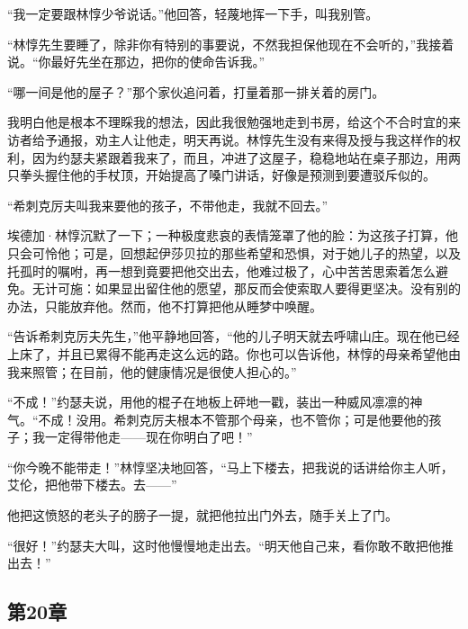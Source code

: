 \par “我一定要跟林惇少爷说话。”他回答，轻蔑地挥一下手，叫我别管。
\par “林惇先生要睡了，除非你有特别的事要说，不然我担保他现在不会听的，”我接着说。“你最好先坐在那边，把你的使命告诉我。”
\par “哪一间是他的屋子？”那个家伙追问着，打量着那一排关着的房门。
\par 我明白他是根本不理睬我的想法，因此我很勉强地走到书房，给这个不合时宜的来访者给予通报，劝主人让他走，明天再说。林惇先生没有来得及授与我这样作的权利，因为约瑟夫紧跟着我来了，而且，冲进了这屋子，稳稳地站在桌子那边，用两只拳头握住他的手杖顶，开始提高了嗓门讲话，好像是预测到要遭驳斥似的。
\par “希刺克厉夫叫我来要他的孩子，不带他走，我就不回去。”
\par 埃德加·林惇沉默了一下；一种极度悲哀的表情笼罩了他的脸：为这孩子打算，他只会可怜他；可是，回想起伊莎贝拉的那些希望和恐惧，对于她儿子的热望，以及托孤时的嘱咐，再一想到竟要把他交出去，他难过极了，心中苦苦思索着怎么避免。无计可施：如果显出留住他的愿望，那反而会使索取人要得更坚决。没有别的办法，只能放弃他。然而，他不打算把他从睡梦中唤醒。
\par “告诉希刺克厉夫先生，”他平静地回答，“他的儿子明天就去呼啸山庄。现在他已经上床了，并且已累得不能再走这么远的路。你也可以告诉他，林惇的母亲希望他由我来照管；在目前，他的健康情况是很使人担心的。”
\par “不成！”约瑟夫说，用他的棍子在地板上砰地一戳，装出一种威风凛凛的神气。“不成！没用。希刺克厉夫根本不管那个母亲，也不管你；可是他要他的孩子；我一定得带他走——现在你明白了吧！”
\par “你今晚不能带走！”林惇坚决地回答，“马上下楼去，把我说的话讲给你主人听，艾伦，把他带下楼去。去——”
\par 他把这愤怒的老头子的膀子一提，就把他拉出门外去，随手关上了门。
\par “很好！”约瑟夫大叫，这时他慢慢地走出去。“明天他自己来，看你敢不敢把他推出去！”


\subsection{第20章}

